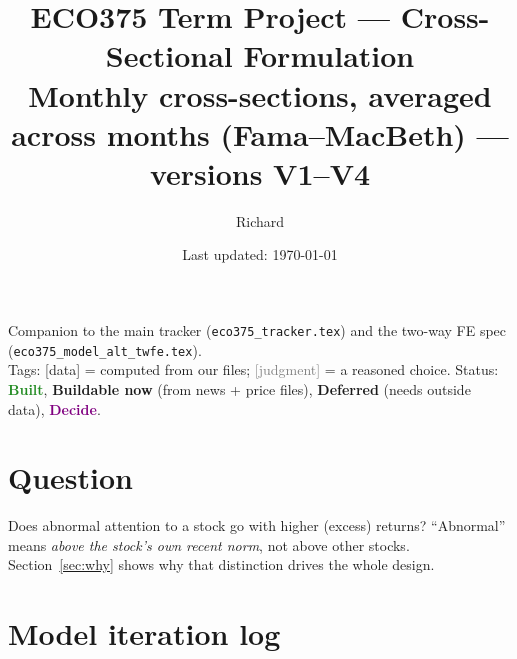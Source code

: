\documentclass[11pt]{article}
\title{ECO375 Term Project --- Cross-Sectional Formulation\\[2pt]\large Monthly cross-sections, averaged across months (Fama--MacBeth) --- versions V1--V4}
\author{Richard}
\date{Last updated: \today}
\newcommand{\done}{\textcolor{ForestGreen}{\textbf{Built}}}
\newcommand{\canbuild}{\textcolor{TealBlue}{\textbf{Buildable now}}}
\newcommand{\dl}{\textcolor{BurntOrange}{\textbf{Deferred}}}
\newcommand{\decide}{\textcolor{Purple}{\textbf{Decide}}}
\newcommand{\data}{\textcolor{NavyBlue}{\textsf{[data]}}}
\newcommand{\judg}{\textcolor{Gray}{\textsf{[judgment]}}}
\newcommand{\var}[1]{\texttt{#1}}
\begin{document}
\maketitle

\noindent Companion to the main tracker (\var{eco375\_tracker.tex}) and the two-way FE spec\\ (\var{eco375\_model\_alt\_twfe.tex}).\\ Tags: \data{} = computed from our files; \judg{} = a reasoned choice. Status: \done, \canbuild{} (from news + price files), \dl{} (needs outside data), \decide.

\tableofcontents

\section{Question}

Does abnormal attention to a stock go with higher (excess) returns? ``Abnormal'' means \emph{above the stock's own recent norm}, not above other stocks. Section~\ref{sec:why} shows why that distinction drives the whole design.

\section{Model iteration log}\label{sec:log}
\end{document}
